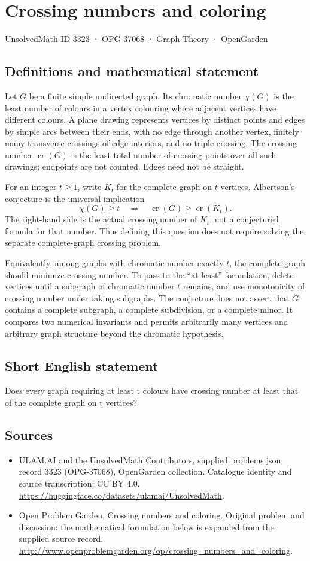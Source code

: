 \documentclass[11pt,a4paper]{article}
\begin{document}
\section*{Crossing numbers and coloring}\label{3323}
{\small UnsolvedMath ID 3323 · OPG-37068 · Graph Theory · OpenGarden}
\subsection{Definitions and mathematical statement}
Let $G$ be a finite simple undirected graph. Its chromatic number
$\chi(G)$ is the least number of colours in a vertex colouring
where adjacent vertices have different colours. A plane drawing
represents vertices by distinct points and edges by simple arcs
between their ends, with no edge through another vertex, finitely
many transverse crossings of edge interiors, and no triple crossing.
The crossing number $\operatorname{cr}(G)$ is the least total number
of crossing points over all such drawings; endpoints are not counted.
Edges need not be straight.

For an integer $t\ge1$, write $K_t$ for the complete graph on $t$
vertices. Albertson's conjecture is the universal implication
\[
                          \chi(G)\ge t
                 \quad\Longrightarrow\quad
                          \operatorname{cr}(G)\ge\operatorname{cr}(K_t).
\]
The right-hand side is the actual crossing number of $K_t$, not a
conjectured formula for that number. Thus defining this question
does not require solving the separate complete-graph crossing problem.

Equivalently, among graphs with chromatic number exactly $t$, the
complete graph should minimize crossing number. To pass to the
``at least'' formulation, delete vertices until a subgraph of
chromatic number $t$ remains, and use monotonicity of crossing number
under taking subgraphs. The conjecture does not assert that $G$
contains a complete subgraph, a complete subdivision, or a complete
minor. It compares two numerical invariants and permits arbitrarily
many vertices and arbitrary graph structure beyond the chromatic
hypothesis.
\subsection{Short English statement}
Does every graph requiring at least t colours have crossing number at least that of the complete graph on t vertices?
\subsection{Sources}
\begin{itemize}
\item[S1] ULAM.AI and the UnsolvedMath Contributors, supplied problems.json, record 3323 (OPG-37068), OpenGarden collection. Catalogue identity and source transcription; CC BY 4.0.
\url{https://huggingface.co/datasets/ulamai/UnsolvedMath}.
\item[S2] Open Problem Garden, Crossing numbers and coloring. Original problem and discussion; the mathematical formulation below is expanded from the supplied source record.
\url{http://www.openproblemgarden.org/op/crossing_numbers_and_coloring}.
\end{itemize}
\end{document}
